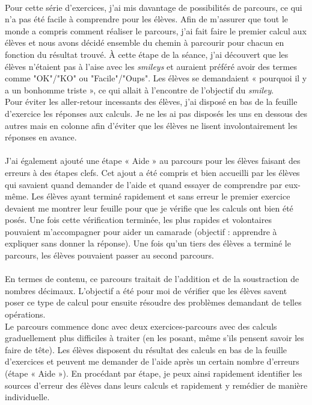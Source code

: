 \paragraph{}Pour cette série d'exercices, j'ai mis davantage de possibilités de parcours, ce qui n'a pas été facile à comprendre pour les élèves. Afin de m'assurer que tout le monde a compris comment réaliser le parcours, j'ai fait faire le premier calcul aux élèves et nous avons décidé ensemble du chemin à parcourir pour chacun en fonction du résultat trouvé. À cette étape de la séance, j'ai découvert que les élèves n'étaient pas à l'aise avec les \textit{smileys} et auraient préféré avoir des termes comme "OK"/"KO" ou "Facile"/"Oups". Les élèves se demandaient « pourquoi il y a un bonhomme triste », ce qui allait à l'encontre de l'objectif du \textit{smiley}.\\
Pour éviter les aller-retour incessants des élèves, j'ai disposé en bas de la feuille d'exercice les réponses aux calculs. Je ne les ai pas disposés les uns en dessous des autres mais en colonne afin d'éviter que les élèves ne lisent involontairement les réponses en avance.
\paragraph{}J'ai également ajouté une étape « Aide » au parcours pour les élèves faisant des erreurs à des étapes clefs. Cet ajout a été compris et bien accueilli par les élèves qui savaient quand demander de l'aide et quand essayer de comprendre par eux-même. Les élèves ayant terminé rapidement et sans erreur le premier exercice devaient me montrer leur feuille pour que je vérifie que les calculs ont bien été posés. Une fois cette vérification terminée, les plus rapides et volontaires pouvaient m'accompagner pour aider un camarade (objectif : apprendre à expliquer sans donner la réponse). Une fois qu'un tiers des élèves a terminé le parcours, les élèves pouvaient passer au second parcours.
\paragraph{} En termes de contenu, ce parcours traitait de l'addition et de la soustraction de nombres décimaux. L'objectif a été pour moi de vérifier que les élèves savent poser ce type de calcul pour ensuite résoudre des problèmes demandant de telles opérations.\\
Le parcours commence donc avec deux exercices-parcours avec des calculs graduellement plus difficiles à traiter (en les posant, même s'ils pensent savoir les faire de tête). Les élèves disposent du résultat des calculs en bas de la feuille d'exercices et peuvent me demander de l'aide après un certain nombre d'erreurs (étape « Aide »). En procédant par étape, je peux ainsi rapidement identifier les sources d'erreur des élèves dans leurs calculs et rapidement y remédier de manière individuelle.\\

